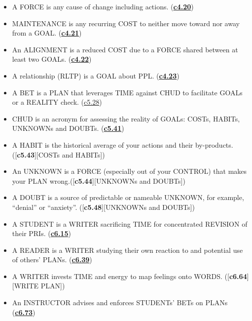 \documentclass[
]{book}
\begin{document}
\begin{itemize}
\item
  A FORCE is any cause of change including actions. (\protect\hyperlink{work}{\textbf{c4.20}})\\
\item
  MAINTENANCE is any recurring COST to neither move toward nor away from a GOAL. (\protect\hyperlink{work}{\textbf{c4.21}})\\
\item
  An ALIGNMENT is a reduced COST due to a FORCE shared between at least two GOALs. (\protect\hyperlink{work}{\textbf{c4.22}})\\
\item
  A relationship (RLTP) is a GOAL about PPL. (\protect\hyperlink{work}{\textbf{c4.23}})\\
\item
  A BET is a PLAN that leverages TIME against CHUD to facilitate GOALs or a REALITY check. (\protect\hyperlink{bet-2}{c5.28})\\
\item
  CHUD is an acronym for assessing the reality of GOALs: COSTs, HABITs, UNKNOWNs and DOUBTs. (\protect\hyperlink{c.h.u.d.}{\textbf{c5.41}})\\
\item
  A HABIT is the historical average of your actions and their by-products.({[}\textbf{c5.43}{]}{[}COSTs and HABITs{]})\\
\item
  An UNKNOWN is a FORCE (especially out of your CONTROL) that makes your PLAN wrong.({[}\textbf{c5.44}{]}{[}UNKNOWNs and DOUBTs{]})\\
\item
  A DOUBT is a source of predictable or nameable UNKNOWN, for example, ``denial'' or ``anxiety''. ({[}\textbf{c5.48}{]}{[}UNKNOWNs and DOUBTs{]})\\
\item
  A STUDENT is a WRITER sacrificing TIME for concentrated REVISION of their PRIs. (\protect\hyperlink{student}{\textbf{c6.15}})\\
\item
  A READER is a WRITER studying their own reaction to and potential use of others' PLANs. (\protect\hyperlink{read}{\textbf{c6.39}})\\
\item
  A WRITER invests TIME and energy to map feelings onto WORDS. ({[}\textbf{c6.64}{]}{[}WRITE PLAN{]})\\
\item
  An INSTRUCTOR advises and enforces STUDENTs' BETs on PLANs (\protect\hyperlink{instructor}{\textbf{c6.73}})\\

\end{itemize}
\end{document}
